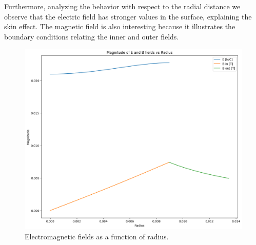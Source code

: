 Furthermore, analyzing the behavior with respect to the radial distance we observe that the electric field has stronger values in the surface, explaining the skin effect. The magnetic field is also interesting because it illustrates the boundary conditions relating the inner and outer fields. 
\begin{figure}[H]
    \centering
    \includegraphics[scale=0.35]{Figures/magnitude-EvsB-radius.png}
    \caption{Electromagnetic fields as a function of radius.}
    \label{fig:emfields-radius}
\end{figure}

